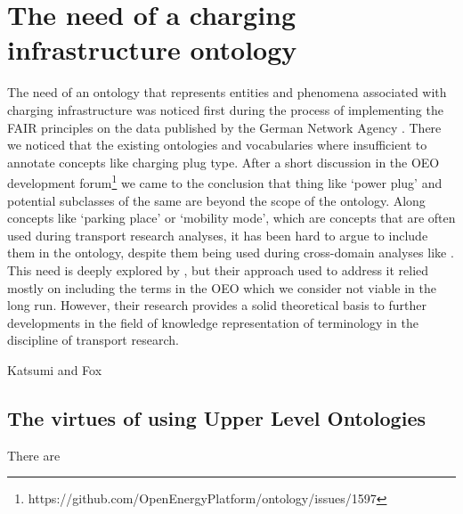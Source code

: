 ﻿\section{The need of a charging infrastructure ontology}

The need of an ontology that represents entities and phenomena associated with
charging infrastructure was noticed first during the process of implementing
the FAIR principles on the data published by the German Network Agency
\cite{ArellanoRuiz.2024}. There we noticed that the existing ontologies and
vocabularies where insufficient to annotate concepts like charging plug type.
After a short discussion in the OEO development
forum\footnote{https://github.com/OpenEnergyPlatform/ontology/issues/1597} we
came to the conclusion that thing like `power plug' and potential subclasses of
the same are beyond the scope of the ontology. Along concepts like `parking
place' or `mobility mode', which are concepts that are often used during
transport research analyses, it has been hard to argue to include them in the
ontology, despite them being used during cross-domain analyses like
\cite{Hecht.2022}. This need is deeply explored by \cite{Mittermeier.2023}, but
their approach used to address it relied mostly on including the terms in the
OEO which we consider not viable in the long run. However, their research
provides a solid theoretical basis to further developments in the field of
knowledge representation of terminology in the discipline of transport
research.

Katsumi and Fox

\subsection{The virtues of using Upper Level Ontologies}

There are 
